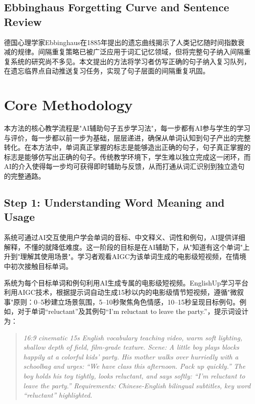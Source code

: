 \documentclass[12pt,a4paper]{ctexart}
\begin{document}
\subsection{Ebbinghaus Forgetting Curve and Sentence Review}

德国心理学家Ebbinghaus在1885年提出的遗忘曲线揭示了人类记忆随时间指数衰减的规律\cite{ebbinghaus1885memory}。间隔重复策略已被广泛应用于词汇记忆领域，但将完整句子纳入间隔重复系统的研究尚不多见。本文提出的方法将学习者仿写正确的句子纳入复习队列，在遗忘临界点自动推送复习任务，实现了句子层面的间隔重复巩固。


\section{Core Methodology}  %

本方法的核心教学流程是"AI辅助句子五步学习法"，每一步都有AI参与学生的学习与评价，每一步都以前一步为基础，层层递进，确保从单词认知到句子产出的完整转化。在本方法中，单词真正掌握的标志是能够造出正确的句子，句子真正掌握的标志是能够仿写出正确的句子。传统教学环境下，学生难以独立完成这一闭环，而AI的介入使得每一步均可获得即时辅助与反馈，从而打通从词汇识别到独立造句的完整通路。

\subsection{Step 1: Understanding Word Meaning and Usage}
系统可通过AI交互使用户学会单词的音标、中文释义、词性和例句，AI提供详细解释，不懂的就降低难度。这一阶段的目标是在AI辅助下，从"知道有这个单词"上升到"理解其使用场景"。学习者观看AIGC为该单词生成的电影级短视频，在情境中初次接触目标单词。

系统为每个目标单词和例句利用AI生成专属的电影级短视频。EnglishUp学习平台利用AIGC技术，根据提示词自动生成15秒以内的电影级情节短视频，遵循"微叙事"原则：0--5秒建立场景氛围，5--10秒聚焦角色情感，10--15秒呈现目标例句。例如，对于单词``reluctant''及其例句``I'm reluctant to leave the party.''，提示词设计为：

\begin{quote}\small
\textit{16:9 cinematic 15s English vocabulary teaching video, warm soft lighting, shallow depth of field, film-grade texture. Scene: A little boy plays blocks happily at a colorful kids' party. His mother walks over hurriedly with a schoolbag and urges: ``We have class this afternoon. Pack up quickly.'' The boy holds his toy tightly, looks reluctant, and says softly: ``I'm reluctant to leave the party.'' Requirements: Chinese-English bilingual subtitles, key word ``reluctant'' highlighted.}
\end{quote}
\end{document}
